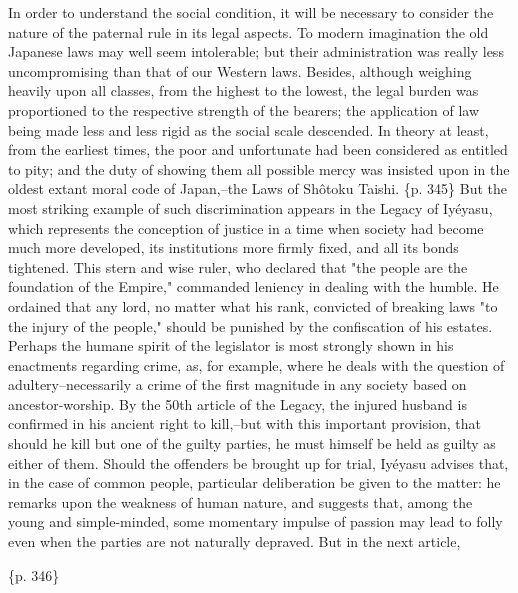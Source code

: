 In order to understand the social condition, it will be necessary to consider the nature of the paternal rule in its legal aspects. To modern imagination the old Japanese laws may well seem intolerable; but their administration was really less uncompromising than that of our Western laws. Besides, although weighing heavily upon all classes, from the highest to the lowest, the legal burden was proportioned to the respective strength of the bearers; the application of law being made less and less rigid as the social scale descended. In theory at least, from the earliest times, the poor and unfortunate had been considered as entitled to pity; and the duty of showing them all possible mercy was insisted upon in the oldest extant moral code of Japan,--the Laws of Shôtoku Taishi. \{p. 345\} But the most striking example of such discrimination appears in the Legacy of Iyéyasu, which represents the conception of justice in a time when society had become much more developed, its institutions more firmly fixed, and all its bonds tightened. This stern and wise ruler, who declared that "the people are the foundation of the Empire," commanded leniency in dealing with the humble. He ordained that any lord, no matter what his rank, convicted of breaking laws "to the injury of the people," should be punished by the confiscation of his estates. Perhaps the humane spirit of the legislator is most strongly shown in his enactments regarding crime, as, for example, where he deals with the question of adultery--necessarily a crime of the first magnitude in any society based on ancestor-worship. By the 50th article of the Legacy, the injured husband is confirmed in his ancient right to kill,--but with this important provision, that should he kill but one of the guilty parties, he must himself be held as guilty as either of them. Should the offenders be brought up for trial, Iyéyasu advises that, in the case of common people, particular deliberation be given to the matter: he remarks upon the weakness of human nature, and suggests that, among the young and simple-minded, some momentary impulse of passion may lead to folly even when the parties are not naturally depraved. But in the next article,

\{p. 346\}

